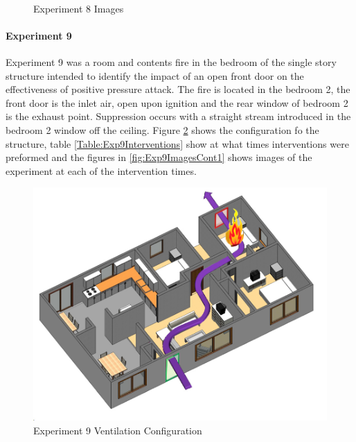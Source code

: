 \documentclass{article}
\begin{document}
\begin{figure}[H]
	\ContinuedFloat 
	\centering 
	 \ 
	\caption{Experiment 8 Images}
	\label{fig:Experiment8ImagesCont3} 
\end{figure}

\paragraph{Experiment 9}\mbox{}

Experiment 9 was a room and contents fire in the bedroom of the single story structure intended to identify the impact of an open front door on the effectiveness of positive pressure attack. The fire is located in the bedroom 2, the front door is the inlet air, open upon ignition and the rear window of bedroom 2 is the exhaust point. Suppression occurs with a straight stream introduced in the bedroom 2 window off the ceiling. Figure \ref{fig:Exp9VentConfig} shows the configuration fo the structure, table \ref{Table:Exp9Interventions} show at what times interventions were preformed and the figures in \ref{fig:Exp9ImagesCont1} shows images of the experiment at each of the intervention times.

\begin{figure}[h!]
	\centering
	\includegraphics[width=5in]{0_Images/FireExperiments/Single_Story/Experiment_9.jpg}
	\caption{Experiment 9 Ventilation Configuration}
	\label{fig:Exp9VentConfig}
\end{figure}
\end{document}
